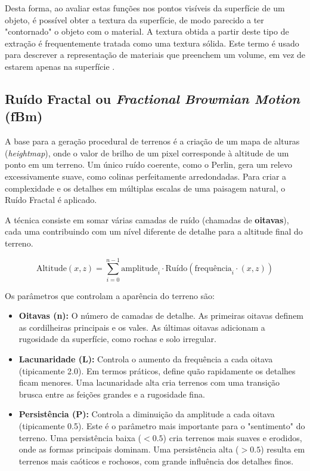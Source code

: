 Desta forma, ao avaliar estas funções nos pontos visíveis da superfície de um objeto, é possível obter a textura da superfície, de modo parecido a ter "contornado" o objeto com o material. A textura obtida a partir deste tipo de extração é frequentemente tratada como uma textura sólida. Este termo é usado para descrever a representação de materiais que preenchem um volume, em vez de estarem apenas na superfície \cite{fractalNoise}.

\subsection{Ruído Fractal ou \textit{Fractional Browmian Motion} (fBm)}

A base para a geração procedural de terrenos é a criação de um mapa de alturas (\textit{heightmap}), onde o valor de brilho de um pixel corresponde à altitude de um ponto em um terreno. Um único ruído coerente, como o Perlin, gera um relevo excessivamente suave, como colinas perfeitamente arredondadas. Para criar a complexidade e os detalhes em múltiplas escalas de uma paisagem natural, o Ruído Fractal é aplicado.

A técnica consiste em somar várias camadas de ruído (chamadas de \textbf{oitavas}), cada uma contribuindo com um nível diferente de detalhe para a altitude final do terreno.

\begin{equation*}
\text{Altitude}(x, z) = \sum_{i=0}^{n-1} \text{amplitude}_i \cdot \text{Ruído}(\text{frequência}_i \cdot (x, z))
\end{equation*}

Os parâmetros que controlam a aparência do terreno são:
\begin{itemize}
\item \textbf{Oitavas (n):} O número de camadas de detalhe. As primeiras oitavas definem as cordilheiras principais e os vales. As últimas oitavas adicionam a rugosidade da superfície, como rochas e solo irregular.
\item \textbf{Lacunaridade (L):} Controla o aumento da frequência a cada oitava (tipicamente 2.0). Em termos práticos, define quão rapidamente os detalhes ficam menores. Uma lacunaridade alta cria terrenos com uma transição brusca entre as feições grandes e a rugosidade fina.

\item \textbf{Persistência (P):} Controla a diminuição da amplitude a cada oitava (tipicamente 0.5). Este é o parâmetro mais importante para o "sentimento" do terreno. Uma persistência baixa ($<0.5$) cria terrenos mais suaves e erodidos, onde as formas principais dominam. Uma persistência alta ($>0.5$) resulta em terrenos mais caóticos e rochosos, com grande influência dos detalhes finos.

\end{itemize}

